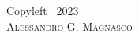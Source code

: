 \phantom{}\vspace{\fill}
\begin{center}
Copyleft ~2023\\
\textsc{Alessandro G. Magnasco}\\
\doclicenseThis
\end{center}